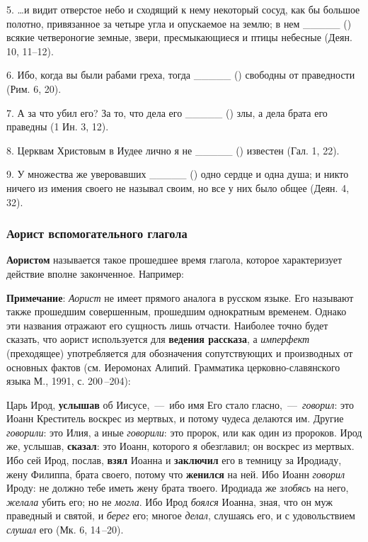 \documentclass[11pt,a4paper,oneside]{memoir}
\newcommand{\hspca}{\hspace{2.4em}}
\begin{document}
5. \ldots и видит отверстое небо и сходящий к нему некоторый сосуд, как бы большое полотно, привязанное за четыре угла и опускаемое на землю; в нем _____ ({}) всякие четвероногие земные, звери, пресмыкающиеся и птицы небесные (Деян. 10, 11--12).

6. Ибо, когда вы были рабами греха, тогда _____ ({}) свободны от праведности (Рим. 6, 20).

7. А за что убил его? За то, что дела его _____ ({}) злы, а дела брата его праведны (1 Ин. 3, 12).

8. Церквам Христовым в Иудее лично я не _____ ({}) известен (Гал. 1, 22).

9. У множества же уверовавших _____ ({}) одно сердце и одна душа; и никто ничего из имения своего не называл своим, но все у них было общее (Деян. 4, 32).

\subsubsection{Аорист вспомогательного глагола {}}

\textbf{Аористом} называется такое прошедшее время глагола, которое характеризует действие вполне законченное. Например:


\bigskip\autorows{l}{1}{l}{
	\hspca{{\slv{То́й речѐ и҆}} {\slv{\large бы́ша}} (Пс. 32, 9)}
}

\textbf{Примечание}: \emph{Аорист} не имеет прямого аналога в русском языке. Его называют также прошедшим совершенным, прошедшим однократным временем. Однако эти названия отражают его сущность лишь отчасти. Наиболее точно будет сказать, что аорист используется для \textbf{ведения рассказа}, а \emph{имперфект} (преходящее) употребляется для обозначения сопутствующих и производных от основных фактов (см. Иеромонах Алипий. Грамматика церковно-славянского языка М., 1991, с. 200\,--204):

Царь Ирод, \textbf{услышав} об Иисусе,~---~ибо имя Его стало гласно,~---~\emph{говорил}: это Иоанн Креститель воскрес из мертвых, и потому чудеса делаются им. Другие \emph{говорили}: это Илия, а иные \emph{говорили}: это пророк, или как один из пророков. Ирод же, услышав, \textbf{сказал}: это Иоанн, которого я обезглавил; он воскрес из мертвых. Ибо сей Ирод, послав, \textbf{взял} Иоанна и \textbf{заключил} его в темницу за Иродиаду, жену Филиппа, брата своего, потому что \textbf{женился} на ней. Ибо Иоанн \emph{говорил} Ироду: не должно тебе иметь жену брата твоего. Иродиада же \emph{злобясь} на него, \emph{желала} убить его; но не \emph{могла}. Ибо Ирод \emph{боялся} Иоанна, зная, что он муж праведный и святой, и \emph{берег} его; многое \emph{делал}, слушаясь его, и с удовольствием \emph{слушал} его (Мк. 6, 14\,--20).
\pagebreak
\end{document}
